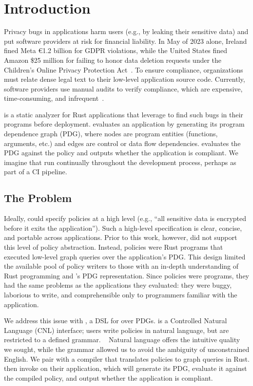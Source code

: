\chapter{Introduction}
\label{sec:intro}

Privacy bugs in applications harm users (e.g., by leaking their sensitive data) and put software providers 
at risk for financial liability.
%
In May of 2023 alone, Ireland fined Meta €1.2 billion for GDPR violations, 
while the United States fined Amazon \$25 million for failing to honor data deletion requests 
under the Children’s Online Privacy Protection Act~\cite{meta-fine,amazon-fine}.
%
To ensure compliance, organizations must relate dense legal text to their low-level application source code.
%
Currently, software providers use manual audits to verify compliance, which are expensive, time-consuming,
and infrequent~\cite{CostContinuousCompliance2020,smithGDPRRacketWho}.

\sys{} is a static analyzer for Rust applications that \devs{} leverage to find such bugs in their programs before deployment.
%
\sys{} evaluates an application by generating its program dependence graph (PDG), 
where nodes are program entities (functions, arguments, etc.) and edges are control or data flow dependencies.
%
\sys{} evaluates the PDG against the policy and outputs whether the application is compliant.
%
We imagine that \devs{} run \sys{} continually throughout the development process, perhaps as part of a CI pipeline.

\section{The Problem}
Ideally, \writers{} could specify policies at a high level (e.g., ``all sensitive data is encrypted before it exits the application'').
%
Such a high-level specification is clear, concise, and portable across applications.
%
Prior to this work, however, \sys{} did not support this level of policy abstraction.
%
Instead, policies were Rust programs that executed low-level graph queries over the application's PDG.
%
This design limited the available pool of policy writers to those with an in-depth understanding of Rust programming and \sys{}'s PDG representation.
%
Since policies were programs, they had the same problems as the applications they evaluated: 
they were buggy, laborious to write, and comprehensible only to programmers familiar with the application.
%

We address this issue with \syslang{}, a DSL for \policies{} over PDGs.
%
\syslang{} is a Controlled Natural Language (CNL) interface; users write policies in natural language, but are restricted to a defined grammar. ~\cite{cnl-def}
%
Natural language offers the intuitive quality we sought, while the grammar allowed us to avoid the ambiguity of unconstrained English.
%
We pair \syslang{} with a compiler that translates policies to \sys{} graph queries in Rust.
%
\Devs{} then invoke \sys{} on their application,
which will generate its PDG, evaluate it against the compiled \syslang{} policy,
and output whether the application is compliant.
%


